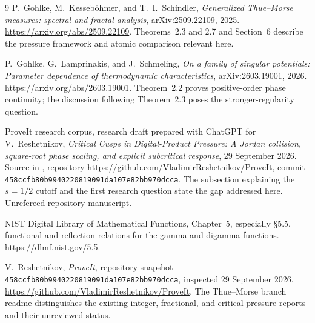 \documentclass[11pt,a4paper]{article}
\numberwithin{equation}{section}
\theoremstyle{definition}
\theoremstyle{remark}
\begin{document}
\begin{thebibliography}{9}
P.~Gohlke, M.~Kesseb\"ohmer, and T.~I.~Schindler,
\emph{Generalized Thue--Morse measures: spectral and fractal analysis},
arXiv:2509.22109, 2025.
\url{https://arxiv.org/abs/2509.22109}.
Theorems~2.3 and 2.7 and Section~6 describe the pressure framework and
atomic comparison relevant here.

P.~Gohlke, G.~Lamprinakis, and J.~Schmeling,
\emph{On a family of singular potentials: Parameter dependence of
thermodynamic characteristics}, arXiv:2603.19001, 2026.
\url{https://arxiv.org/abs/2603.19001}.
Theorem~2.2 proves positive-order phase continuity; the discussion
following Theorem~2.3 poses the stronger-regularity question.

ProveIt research corpus, research draft prepared with ChatGPT for
V.~Reshetnikov,
\emph{Critical Cusps in Digital-Product Pressure: A Jordan collision,
square-root phase scaling, and explicit subcritical response},
29 September 2026. Source in
,
repository \url{https://github.com/VladimirReshetnikov/ProveIt},
commit \nolinkurl{458ccfb80b9940220819091da107e82bb970dcca}.
The subsection explaining the $s=1/2$ cutoff and the first research
question state the gap addressed here. Unrefereed repository manuscript.

NIST Digital Library of Mathematical Functions,
Chapter~5, especially \S5.5, functional and reflection relations for
the gamma and digamma functions.
\url{https://dlmf.nist.gov/5.5}.

V.~Reshetnikov, \emph{ProveIt}, repository snapshot
\nolinkurl{458ccfb80b9940220819091da107e82bb970dcca}, inspected
29 September 2026.
\url{https://github.com/VladimirReshetnikov/ProveIt}.
The Thue--Morse branch readme distinguishes the existing integer,
fractional, and critical-pressure reports and their unreviewed status.
\end{thebibliography}
\end{document}
